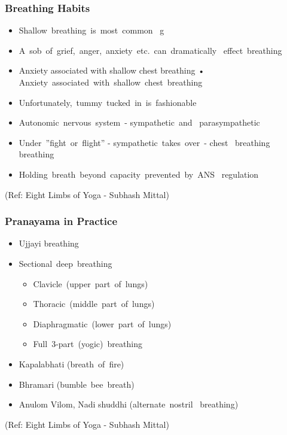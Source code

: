 \begin{frame}[fragile]\frametitle{Breathing Habits}


	\begin{itemize}
	\item  Shallow breathing is most common  g
	\item  A sob of grief, anger, anxiety etc. can dramatically 
effect breathing
	\item   Anxiety associated with shallow chest breathing • Anxiety associated with shallow chest breathing
	\item  Unfortunately, tummy tucked in is fashionable
	\item   Autonomic nervous system - sympathetic and  parasympathetic
	\item  Under ''fight or flight'' - sympathetic takes over - chest 
breathing breathing
	\item   Holding breath beyond capacity prevented by ANS 
regulation
	
	\end{itemize}

\tiny{(Ref: Eight Limbs of Yoga - Subhash Mittal)}

\end{frame}



\begin{frame}[fragile]\frametitle{Pranayama in Practice}


	\begin{itemize}
	\item  Ujjayi breathing
	\item  Sectional deep breathing
	\begin{itemize}
	
	\item  Clavicle (upper part of lungs)
	\item Thoracic (middle part of lungs)
	\item Diaphragmatic (lower part of lungs)
	\item  Full 3-part (yogic) breathing	
	\end{itemize}
	\item Kapalabhati (breath of fire)
	\item Bhramari (bumble bee breath)
	\item Anulom Vilom, Nadi shuddhi (alternate nostril 
breathing)
	\end{itemize}

\tiny{(Ref: Eight Limbs of Yoga - Subhash Mittal)}

\end{frame}